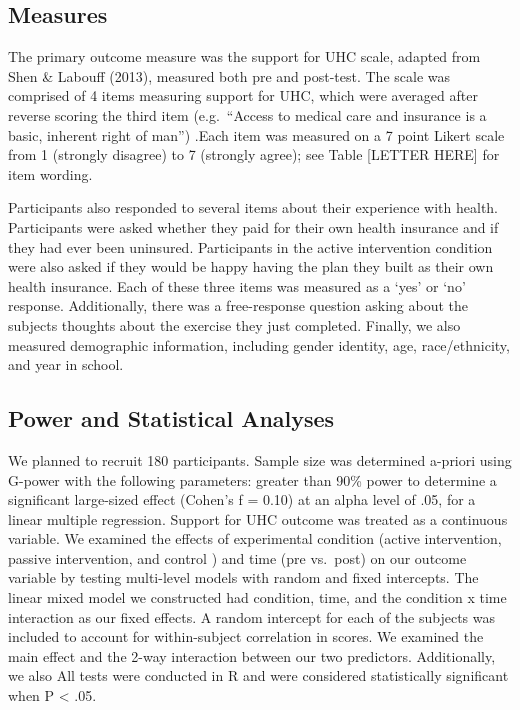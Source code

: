 \documentclass[
  english,
  man]{apa6}
\begin{document}
\hypertarget{measures}{%
\subsection{Measures}\label{measures}}

The primary outcome measure was the support for UHC scale, adapted from Shen \& Labouff (2013), measured both pre and post-test. The scale was comprised of 4 items measuring support for UHC, which were averaged after reverse scoring the third item (e.g.~``Access to medical care and insurance is a basic, inherent right of man'') .Each item was measured on a 7 point Likert scale from 1 (strongly disagree) to 7 (strongly agree); see Table {[}LETTER HERE{]} for item wording.

Participants also responded to several items about their experience with health. Participants were asked whether they paid for their own health insurance and if they had ever been uninsured. Participants in the active intervention condition were also asked if they would be happy having the plan they built as their own health insurance. Each of these three items was measured as a `yes' or `no' response. Additionally, there was a free-response question asking about the subjects thoughts about the exercise they just completed. Finally, we also measured demographic information, including gender identity, age, race/ethnicity, and year in school.

\hypertarget{power-and-statistical-analyses}{%
\subsection{Power and Statistical Analyses}\label{power-and-statistical-analyses}}

We planned to recruit 180 participants. Sample size was determined a-priori using G-power with the following parameters: greater than 90\% power to determine a significant large-sized effect (Cohen's f = 0.10) at an alpha level of .05, for a linear multiple regression. Support for UHC outcome was treated as a continuous variable. We examined the effects of experimental condition (active intervention, passive intervention, and control ) and time (pre vs.~post) on our outcome variable by testing multi-level models with random and fixed intercepts. The linear mixed model we constructed had condition, time, and the condition x time interaction as our fixed effects. A random intercept for each of the subjects was included to account for within-subject correlation in scores. We examined the main effect and the 2-way interaction between our two predictors. Additionally, we also All tests were conducted in R and were considered statistically significant when P \textless{} .05.
\end{document}
